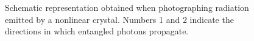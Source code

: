 \begin{figure}
\centering


\caption{Schematic representation obtained when photographing radiation emitted by a nonlinear crystal. Numbers 1 and 2 indicate the directions in which entangled photons propagate.}
\label{figEntangGen2}
\end{figure}